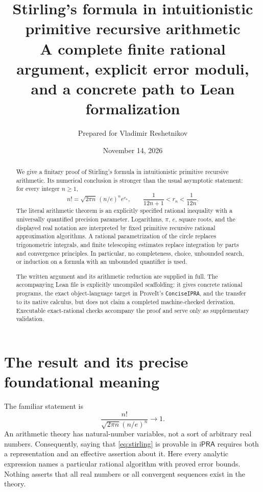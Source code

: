 \documentclass[11pt]{article}
\title{\textbf{Stirling's formula in intuitionistic\protect\\primitive recursive arithmetic}\\[6pt]
\large A complete finite rational argument, explicit error moduli,\\and a concrete path to Lean formalization}
\author{Prepared for Vladimir Reshetnikov}
\date{November 14, 2026}
\theoremstyle{definition}
\newcommand{\ipra}{\mathsf{iPRA}}
\begin{document}
\maketitle
\begin{abstract}
We give a finitary proof of Stirling's formula in intuitionistic primitive
recursive arithmetic. Its numerical conclusion is stronger than the usual
asymptotic statement: for every integer $n\ge1$,
\[
 n!=\sqrt{2\pi n}\,(n/e)^n e^{r_n},
 \qquad \frac1{12n+1}<r_n<\frac1{12n}.
\]
The literal arithmetic theorem is an explicitly specified rational
inequality with a universally quantified precision parameter. Logarithms,
$\pi$, $e$, square roots, and the displayed real notation are interpreted by
fixed primitive recursive rational approximation algorithms. A rational
parametrization of the circle replaces trigonometric integrals, and finite
telescoping estimates replace integration by parts and convergence
principles. In particular, no completeness, choice, unbounded search, or
induction on a formula with an unbounded quantifier is used.

The written argument and its arithmetic reduction are supplied in full.
The accompanying Lean file is explicitly uncompiled scaffolding: it gives
concrete rational programs, the exact object-language target in ProveIt's
\texttt{ConciseIPRA}, and the transfer to its native calculus, but does not
claim a completed machine-checked derivation. Executable exact-rational
checks accompany the proof and serve only as supplementary validation.
\end{abstract}
\newpage
\tableofcontents
\newpage

\section{The result and its precise foundational meaning}
\label{sec:statement}

The familiar statement is
\begin{equation}\label{eq:stirling}
 \frac{n!}{\sqrt{2\pi n}(n/e)^n}\longrightarrow1.
\end{equation}
An arithmetic theory has natural-number variables, not a sort of arbitrary
real numbers. Consequently, saying that \eqref{eq:stirling} is provable in
$\ipra$ requires both a representation and an effective assertion about it.
Here every analytic expression names a particular rational algorithm with
proved error bounds. Nothing asserts that all real numbers or all
convergent sequences exist in the theory.
\end{document}
